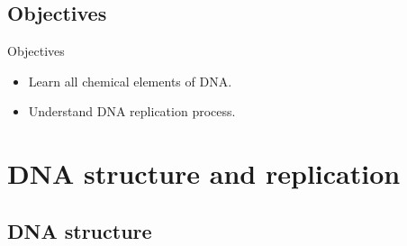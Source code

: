 \documentclass[10pt]{beamer}
\newcommand{\1}{
	\setbeamertemplate{background}{
		\texttt{[image: img/1]}
		\tikz[overlay] \fill[fill opacity=0.75,fill=white] (0,0) rectangle (-\paperwidth,\paperheight);
	}
}
\begin{document}
\subsection{Objectives}

\begin{frame}{Objectives}{}
\begin{itemize}
    \item<1-> Learn all chemical elements of DNA. 
    \item<2-> Understand DNA replication process.
  \end{itemize}
\end{frame}

\section{DNA structure and replication}




\subsection{DNA structure}
\end{document}
